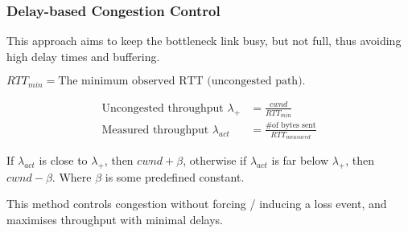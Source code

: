 \subsubsection{Delay-based Congestion Control}

This approach aims to keep the bottleneck link busy, but not full,
thus avoiding high delay times and buffering.

$RTT_{min}=\textrm{The minimum observed RTT (uncongested path).}$

\begin{equation}
    \begin{split}
        \textrm{Uncongested throughput }\lambda_+ &= \frac{cwnd}{RTT_{min}} \\
        \textrm{Measured throughput }\lambda_{act} &= \frac{\textrm{\# of bytes sent}}{RTT_{measured}}
    \end{split}
\end{equation}

If $\lambda_{act}$ is close to $\lambda_+$, then $cwnd+\beta$, otherwise if $\lambda_{act}$ is far below $\lambda_+$, then $cwnd-\beta$.
Where $\beta$ is some predefined constant.

This method controls congestion without forcing / inducing a loss event, and maximises throughput with minimal delays.